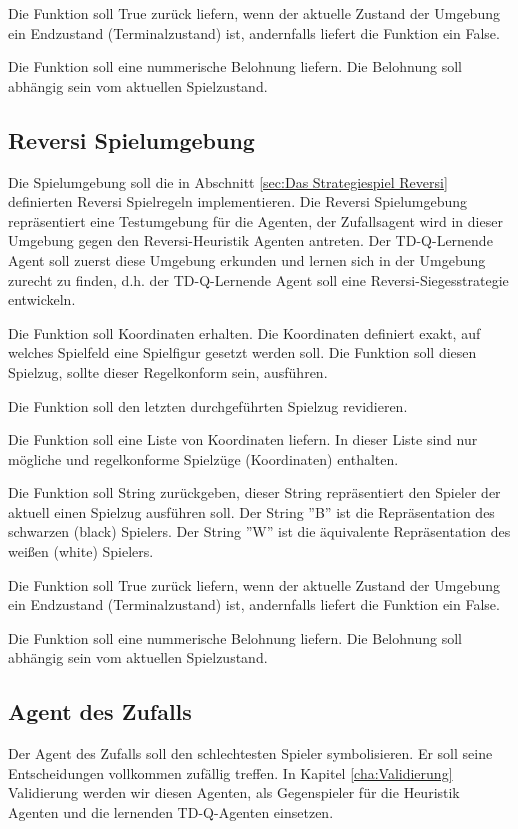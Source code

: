 Die Funktion soll True zurück liefern, wenn der aktuelle Zustand der Umgebung ein Endzustand (Terminalzustand) ist, andernfalls liefert die Funktion ein False.

Die Funktion soll eine nummerische Belohnung liefern. Die Belohnung soll abhängig sein vom aktuellen Spielzustand.

\subsection{Reversi Spielumgebung}
Die Spielumgebung soll die in Abschnitt \ref{sec:Das Strategiespiel Reversi} definierten Reversi Spielregeln implementieren. Die Reversi Spielumgebung repräsentiert eine Testumgebung für die Agenten, der Zufallsagent wird in dieser Umgebung gegen den Reversi-Heuristik Agenten antreten. Der TD-Q-Lernende Agent soll zuerst diese Umgebung erkunden und lernen sich in der Umgebung zurecht zu finden, d.h. der TD-Q-Lernende Agent soll eine Reversi-Siegesstrategie entwickeln. 

Die Funktion soll Koordinaten erhalten. Die Koordinaten definiert exakt, auf welches Spielfeld eine Spielfigur gesetzt werden soll. Die Funktion soll diesen Spielzug, sollte dieser Regelkonform sein, ausführen.

Die Funktion soll den letzten durchgeführten Spielzug revidieren.

Die Funktion soll eine Liste von Koordinaten liefern. In dieser Liste sind nur mögliche und regelkonforme Spielzüge (Koordinaten) enthalten.

Die Funktion soll String zurückgeben, dieser String repräsentiert den Spieler der aktuell einen Spielzug ausführen soll. Der String ''B'' ist die Repräsentation des schwarzen (black) Spielers. Der String ''W'' ist die äquivalente Repräsentation des weißen (white) Spielers.

Die Funktion soll True zurück liefern, wenn der aktuelle Zustand der Umgebung ein Endzustand (Terminalzustand) ist, andernfalls liefert die Funktion ein False.

Die Funktion soll eine nummerische Belohnung liefern. Die Belohnung soll abhängig sein vom aktuellen Spielzustand.

\subsection{Agent des Zufalls}
Der Agent des Zufalls soll den schlechtesten Spieler symbolisieren. Er soll seine Entscheidungen vollkommen zufällig treffen. In Kapitel \ref{cha:Validierung} Validierung werden wir diesen Agenten, als Gegenspieler für die Heuristik Agenten und die lernenden TD-Q-Agenten einsetzen. \\

